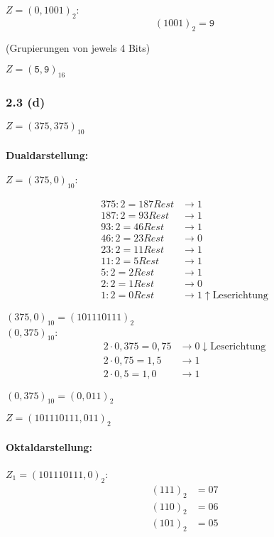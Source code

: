 \documentclass[11pt,a4paper]{article}
\begin{document}
$Z = (0,1001)_2$:
\begin{equation*}
(1001)_2 = \mathtt{9}
\end{equation*}

(Grupierungen von jewels 4 Bits)

$Z =(\mathtt{5,9})_{16}$


\subsubsection{2.3 (d)}
$Z = (375,375)_{10}$

\paragraph{Dualdarstellung:}
$Z = (375,0)_{10}:$

\begin{align*}
375 : 2 = 187 Rest &\rightarrow 1\\
187 : 2 = 93 Rest &\rightarrow 1\\
93 : 2 = 46 Rest &\rightarrow 1\\
46 : 2 = 23 Rest &\rightarrow 0\\
23 : 2 = 11 Rest &\rightarrow 1\\
11 : 2 = 5 Rest &\rightarrow 1\\
5 : 2 = 2 Rest &\rightarrow 1\\
2: 2 = 1  Rest &\rightarrow 0\\
1 : 2 = 0 Rest &\rightarrow 1 \uparrow \mbox{Leserichtung}
\end{align*}

$(375,0)_{10}= (101110111)_2$\\

$(0,375)_{10}$:
\begin{align*}
2 \cdot 0,375 = 0,75 &\rightarrow 0 \downarrow \mbox{Leserichtung}\\
2 \cdot 0,75= 1,5 &\rightarrow 1\\
2 \cdot 0,5 = 1,0 &\rightarrow 1
\end{align*}

$(0,375)_{10} = (0,011)_{2}$

$Z = (101110111,011)_2$

\paragraph{Oktaldarstellung:}
$Z_1 = (101110111,0)_2$:
\begin{align*}
(111)_2 &= 07\\
(110)_2 &= 06\\
(101)_2 &= 05
\end{align*}
\end{document}
